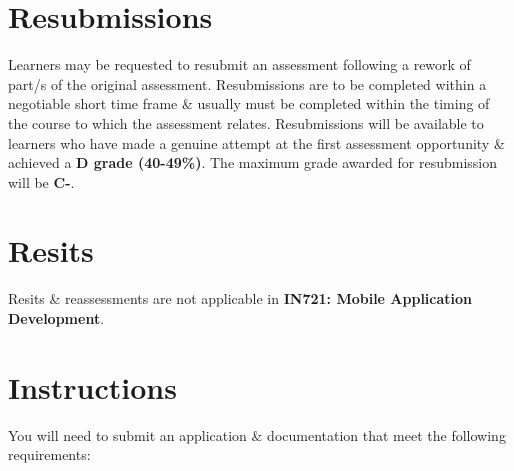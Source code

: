 \documentclass{article}
\begin{document}
\section*{Resubmissions}
Learners may be requested to resubmit an assessment following a rework of part/s of the original assessment. Resubmissions are to be completed within a negotiable short time frame \& usually must be completed within the timing of the course to which the assessment relates. Resubmissions will be available to learners who have made a genuine attempt at the first assessment opportunity \& achieved a \textbf{D grade (40-49\%)}. The maximum grade awarded for resubmission will be \textbf{C-}.

\section*{Resits}
Resits \& reassessments are not applicable in \textbf{IN721: Mobile Application Development}. 

\newpage

\section*{Instructions}
You will need to submit an application \& documentation that meet the following requirements:
\end{document}
